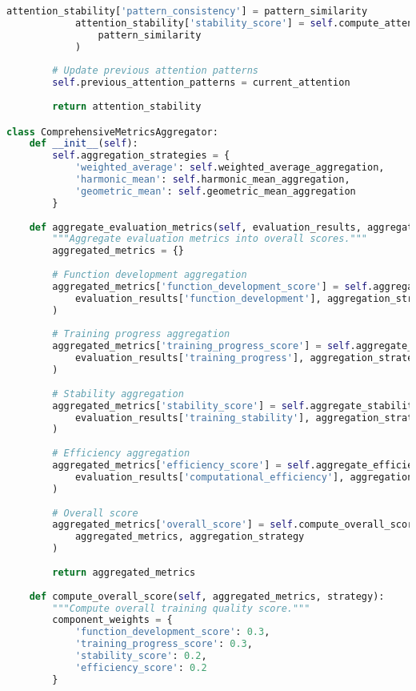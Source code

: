 \begin{lstlisting}[language=Python, caption=Comprehensive evaluation metrics framework for special token training]
            attention_stability['pattern_consistency'] = pattern_similarity
            attention_stability['stability_score'] = self.compute_attention_stability_score(
                pattern_similarity
            )
        
        # Update previous attention patterns
        self.previous_attention_patterns = current_attention
        
        return attention_stability

class ComprehensiveMetricsAggregator:
    def __init__(self):
        self.aggregation_strategies = {
            'weighted_average': self.weighted_average_aggregation,
            'harmonic_mean': self.harmonic_mean_aggregation,
            'geometric_mean': self.geometric_mean_aggregation
        }
    
    def aggregate_evaluation_metrics(self, evaluation_results, aggregation_strategy='weighted_average'):
        """Aggregate evaluation metrics into overall scores."""
        aggregated_metrics = {}
        
        # Function development aggregation
        aggregated_metrics['function_development_score'] = self.aggregate_function_development(
            evaluation_results['function_development'], aggregation_strategy
        )
        
        # Training progress aggregation
        aggregated_metrics['training_progress_score'] = self.aggregate_training_progress(
            evaluation_results['training_progress'], aggregation_strategy
        )
        
        # Stability aggregation
        aggregated_metrics['stability_score'] = self.aggregate_stability_metrics(
            evaluation_results['training_stability'], aggregation_strategy
        )
        
        # Efficiency aggregation
        aggregated_metrics['efficiency_score'] = self.aggregate_efficiency_metrics(
            evaluation_results['computational_efficiency'], aggregation_strategy
        )
        
        # Overall score
        aggregated_metrics['overall_score'] = self.compute_overall_score(
            aggregated_metrics, aggregation_strategy
        )
        
        return aggregated_metrics
    
    def compute_overall_score(self, aggregated_metrics, strategy):
        """Compute overall training quality score."""
        component_weights = {
            'function_development_score': 0.3,
            'training_progress_score': 0.3,
            'stability_score': 0.2,
            'efficiency_score': 0.2
        }
        

\end{lstlisting}
